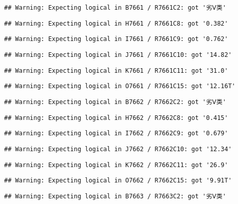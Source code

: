 \documentclass[
]{article}
\begin{document}
\begin{verbatim}
## Warning: Expecting logical in B7661 / R7661C2: got '劣Ⅴ类'
\end{verbatim}

\begin{verbatim}
## Warning: Expecting logical in H7661 / R7661C8: got '0.382'
\end{verbatim}

\begin{verbatim}
## Warning: Expecting logical in I7661 / R7661C9: got '0.762'
\end{verbatim}

\begin{verbatim}
## Warning: Expecting logical in J7661 / R7661C10: got '14.82'
\end{verbatim}

\begin{verbatim}
## Warning: Expecting logical in K7661 / R7661C11: got '31.0'
\end{verbatim}

\begin{verbatim}
## Warning: Expecting logical in O7661 / R7661C15: got '12.16T'
\end{verbatim}

\begin{verbatim}
## Warning: Expecting logical in B7662 / R7662C2: got '劣Ⅴ类'
\end{verbatim}

\begin{verbatim}
## Warning: Expecting logical in H7662 / R7662C8: got '0.415'
\end{verbatim}

\begin{verbatim}
## Warning: Expecting logical in I7662 / R7662C9: got '0.679'
\end{verbatim}

\begin{verbatim}
## Warning: Expecting logical in J7662 / R7662C10: got '12.34'
\end{verbatim}

\begin{verbatim}
## Warning: Expecting logical in K7662 / R7662C11: got '26.9'
\end{verbatim}

\begin{verbatim}
## Warning: Expecting logical in O7662 / R7662C15: got '9.91T'
\end{verbatim}

\begin{verbatim}
## Warning: Expecting logical in B7663 / R7663C2: got '劣Ⅴ类'
\end{verbatim}
\end{document}
